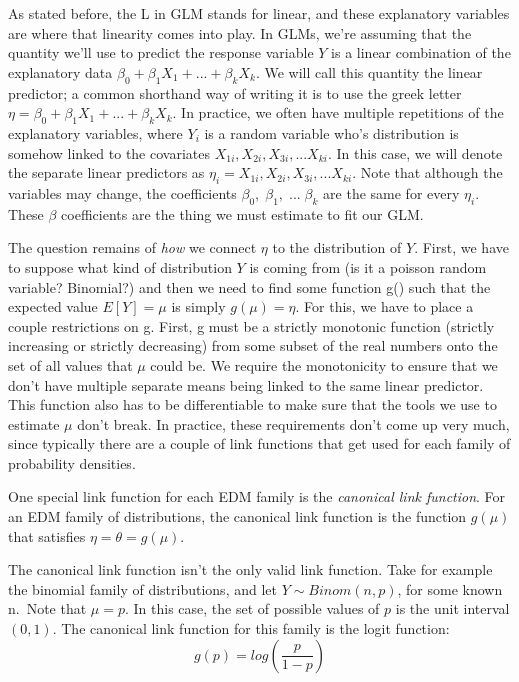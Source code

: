 \documentclass[
]{book}
\begin{document}
As stated before, the L in GLM stands for linear, and these explanatory variables are where that linearity comes into play. In GLMs, we're assuming that the quantity we'll use to predict the response variable \(Y\) is a linear combination of the explanatory data \(\beta_0+\beta_1X_{1}+...+\beta_kX_{k}\). We will call this quantity the linear predictor; a common shorthand way of writing it is to use the greek letter \(\eta = \beta_0+\beta_1X_{1}+...+\beta_kX_{k}\). In practice, we often have multiple repetitions of the explanatory variables, where \(Y_i\) is a random variable who's distribution is somehow linked to the covariates \(X_{1i}, X_{2i}, X_{3i},...X_{ki}\). In this case, we will denote the separate linear predictors as \(\eta_i = X_{1i}, X_{2i}, X_{3i},...X_{ki}\). Note that although the variables may change, the coefficients \(\beta_0, \; \beta_1, \; ... \; \beta_k\) are the same for every \(\eta_i\). These \(\beta\) coefficients are the thing we must estimate to fit our GLM.

The question remains of \emph{how} we connect \(\eta\) to the distribution of \(Y\). First, we have to suppose what kind of distribution \(Y\) is coming from (is it a poisson random variable? Binomial?) and then we need to find some function g() such that the expected value \(E[Y] = \mu\) is simply \(g(\mu) = \eta\). For this, we have to place a couple restrictions on g. First, g must be a strictly monotonic function (strictly increasing or strictly decreasing) from some subset of the real numbers onto the set of all values that \(\mu\) could be. We require the monotonicity to ensure that we don't have multiple separate means being linked to the same linear predictor. This function also has to be differentiable to make sure that the tools we use to estimate \(\mu\) don't break. In practice, these requirements don't come up very much, since typically there are a couple of link functions that get used for each family of probability densities.

One special link function for each EDM family is the \emph{canonical link function}. For an EDM family of distributions, the canonical link function is the function \(g(\mu)\) that satisfies \(\eta=\theta=g(\mu)\).

The canonical link function isn't the only valid link function. Take for example the binomial family of distributions, and let \(Y\sim Binom(n,p)\), for some known n.~Note that \(\mu = p\). In this case, the set of possible values of \(p\) is the unit interval \((0,1)\). The canonical link function for this family is the logit function:
\[
g(p) = log\left(\frac{p}{1-p}\right)
\]
\end{document}
